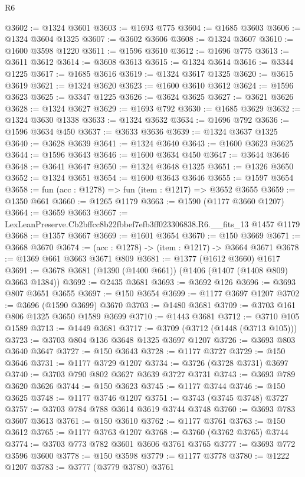 \begin{lexlean}{R6}
\begin{coremodule}
@3602 := @1324 @3601
@3603 := @1693 @775
@3604 := @1685 @3603
@3606 := @1324 @3604 @1325
@3607 := @3602 @3606
@3608 := @1324 @3607
@3610 := @1600 @3598 @1220
@3611 := @1596 @3610
@3612 := @1696 @775
@3613 := @3611 @3612
@3614 := @3608 @3613
@3615 := @1324 @3614
@3616 := @3344 @1225
@3617 := @1685 @3616
@3619 := @1324 @3617 @1325
@3620 := @3615 @3619
@3621 := @1324 @3620
@3623 := @1600 @3610 @3612
@3624 := @1596 @3623
@3625 := @3347 @1225
@3626 := @3624 @3625
@3627 := @3621 @3626
@3628 := @1324 @3627
@3629 := @1693 @792
@3630 := @1685 @3629
@3632 := @1324 @3630 @1338
@3633 := @1324 @3632
@3634 := @1696 @792
@3636 := @1596 @3634 @450
@3637 := @3633 @3636
@3639 := @1324 @3637 @1325
@3640 := @3628 @3639
@3641 := @1324 @3640
@3643 := @1600 @3623 @3625
@3644 := @1596 @3643
@3646 := @1600 @3634 @450
@3647 := @3644 @3646
@3648 := @3641 @3647
@3650 := @1324 @3648 @1325
@3651 := @1326 @3650
@3652 := @1324 @3651
@3654 := @1600 @3643 @3646
@3655 := @1597 @3654
@3658 := fun (acc : @1278) => fun (item : @1217) => @3652 @3655
@3659 := @1350 @661
@3660 := @1265 @1179
@3663 := @1590 (@1177 @3660 @1207)
@3664 := @3659 @3663
@3667 := LexLeanPreserve.Cb2bffcc8b22fbbef7efb3ff023306838.R6.__fits_13 @1457 @1179
@3668 := @1357 @3667
@3669 := @1601 @3654
@3670 := @150 @3669
@3671 := @3668 @3670
@3674 := (acc : @1278) -> (item : @1217) -> @3664 @3671
@3678 := @1369 @661 @3663 @3671 @809
@3681 := @1377 (@1612 @3660) @1617
@3691 := @3678 @3681 (@1390 (@1400 @661)) (@1406 (@1407 (@1408 @809) @3663 @1384))
@3692 := @2435 @3681
@3693 := @3692 @126
@3696 := @3693 @807 @3651 @3655
@3697 := @150 @3654
@3699 := @1177 @3697 @1207
@3702 := @3696 (@1590 @3699) @3670
@3703 := @1480 @3681
@3709 := @3703 @161 @806 @1325 @3650 @1589 @3699
@3710 := @1443 @3681
@3712 := @3710 @105 @1589
@3713 := @1449 @3681
@3717 := @3709 (@3712 (@1448 (@3713 @105)))
@3723 := @3703 @804 @136 @3648 @1325 @3697 @1207
@3726 := @3693 @803 @3640 @3647
@3727 := @150 @3643
@3728 := @1177 @3727
@3729 := @150 @3646
@3731 := @1177 @3729 @1207
@3734 := @3726 (@3728 @3731) @3697
@3740 := @3703 @790 @802 @3627 @3639 @3727 @3731
@3743 := @3693 @789 @3620 @3626
@3744 := @150 @3623
@3745 := @1177 @3744
@3746 := @150 @3625
@3748 := @1177 @3746 @1207
@3751 := @3743 (@3745 @3748) @3727
@3757 := @3703 @784 @788 @3614 @3619 @3744 @3748
@3760 := @3693 @783 @3607 @3613
@3761 := @150 @3610
@3762 := @1177 @3761
@3763 := @150 @3612
@3765 := @1177 @3763 @1207
@3768 := @3760 (@3762 @3765) @3744
@3774 := @3703 @773 @782 @3601 @3606 @3761 @3765
@3777 := @3693 @772 @3596 @3600
@3778 := @150 @3598
@3779 := @1177 @3778
@3780 := @1222 @1207
@3783 := @3777 (@3779 @3780) @3761

\end{coremodule}
\end{lexlean}
